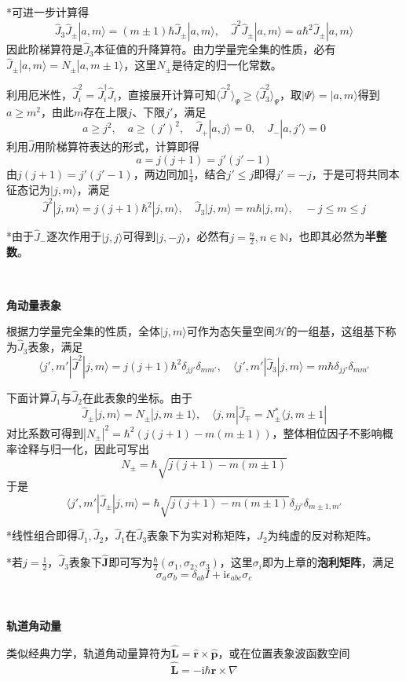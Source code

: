\documentclass[a4paper,UTF8,fontset=windows]{ctexart}
\newcommand*{\ir}{\mathrm{i}}
\newcommand*{\ket}[1]{|#1\rangle}
\newcommand*{\bra}[1]{\langle#1|}
\newcommand*{\blk}[3]{\langle#1|#2|#3\rangle}
\newcommand*{\br}{\mathbf{r}}
\newcommand*{\bp}{\mathbf{p}}
\newcommand*{\bj}{\mathbf{J}}
\newcommand*{\bl}{\mathbf{L}}
\begin{document}
*可进一步计算得
$$\hat{J}_3\hat{J}_\pm\ket{a,m}=(m\pm 1)\hbar\hat{J}_\pm\ket{a,m},\quad\hat{J}^2\hat{J}_\pm\ket{a,m}=a\hbar^2\hat{J}_\pm\ket{a,m}$$
因此阶梯算符是$\hat{J}_3$本征值的升降算符。由力学量完全集的性质，必有$\hat{J}_\pm\ket{a,m}=N_\pm\ket{a,m\pm 1}$，这里$N_\pm$是待定的归一化常数。

利用厄米性，$\hat{J}_i^2=\hat{J}_i^\dagger\hat{J}_i$，直接展开计算可知$\langle\hat{J}^2\rangle_\Psi\ge\langle\hat{J}_3^2\rangle_\Psi$，取$\ket{\Psi}=\ket{a,m}$得到$a\ge m^2$，由此$m$存在上限$j$、下限$j'$，满足
$$a\ge j^2,\quad a\ge(j')^2,\quad\hat{J}_+\ket{a,j}=0,\quad\hat{J}_-\ket{a,j'}=0$$
利用$\hat{J}$用阶梯算符表达的形式，计算即得
$$a=j(j+1)=j'(j'-1)$$
由$j(j+1)=j'(j'-1)$，两边同加$\frac{1}{4}$，结合$j'\le j$即得$j'=-j$，于是可将共同本征态记为$\ket{j,m}$，满足
$$\hat{J}^2\ket{j,m}=j(j+1)\hbar^2\ket{j,m},\quad\hat{J}_3\ket{j,m}=m\hbar\ket{j,m},\quad -j\le m\le j$$

*由于$\hat{J}_-$逐次作用于$\ket{j,j}$可得到$\ket{j,-j}$，必然有$j=\frac{n}{2},n\in\mathbb{N}$，也即其必然为\textbf{半整数}。

\

\textbf{角动量表象}

根据力学量完全集的性质，全体$\ket{j,m}$可作为态矢量空间$\mathcal{H}$的一组基，这组基下称为$\hat{J}_3$表象，满足
$$\blk{j',m'}{\hat{J}^2}{j,m}=j(j+1)\hbar^2\delta_{jj'}\delta_{mm'},\quad\blk{j',m'}{\hat{J}_3}{j,m}=m\hbar\delta_{jj'}\delta_{mm'}$$

下面计算$\hat{J}_1$与$\hat{J}_2$在此表象的坐标。由于
$$\hat{J}_\pm\ket{j,m}=N_\pm\ket{j,m\pm1},\quad\bra{j,m}\hat{J}_{\mp}=N_\pm^*\bra{j,m\pm1}$$
对比系数可得到$|N_\pm|^2=\hbar^2(j(j+1)-m(m\pm 1))$，整体相位因子不影响概率诠释与归一化，因此可写出
$$N_\pm=\hbar\sqrt{j(j+1)-m(m\pm 1)}$$
于是
$$\blk{j',m'}{\hat{J}_\pm}{j,m}=\hbar\sqrt{j(j+1)-m(m\pm1)}\delta_{jj'}\delta_{m\pm1,m'}$$

*线性组合即得$\hat{J}_1,\hat{J}_2$，$\hat{J}_1$在$\hat{J}_3$表象下为实对称矩阵，$\hat{J}_2$为纯虚的反对称矩阵。

*若$j=\frac{1}{2}$，$\hat{J}_3$表象下$\hat{\bj}$即可写为$\frac{\hbar}{2}(\sigma_1,\sigma_2,\sigma_3)$，这里$\sigma_i$即为上章的\textbf{泡利矩阵}，满足
$$\sigma_a\sigma_b=\delta_{ab}I+\ir\epsilon_{abc}\sigma_c$$

\

\textbf{轨道角动量}

类似经典力学，轨道角动量算符为$\hat{\bl}=\hat{\br}\times\hat{\bp}$，或在位置表象波函数空间
$$\hat{\bl}=-\ir\hbar\br\times\nabla$$
\end{document}
